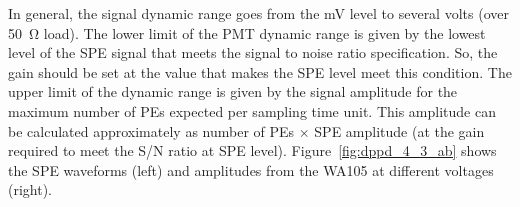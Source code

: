 
In general, the  signal dynamic range goes from the \si{mV} level to several volts (over \SI{50}{\ohm} load). The lower limit of the PMT dynamic range is given by the lowest level of the SPE signal that meets the signal to noise ratio specification. So, the  gain should be set at the value that makes the SPE level meet this condition. The upper limit of the dynamic range is given by the  signal amplitude for the maximum number of PEs expected per sampling time unit. This amplitude can be calculated approximately as number of PEs $\times$ SPE amplitude (at the gain required to meet the S/N ratio at SPE level). Figure~\ref{fig:dppd_4_3_ab} shows the SPE waveforms (left) and amplitudes from the WA105 at different voltages (right).

